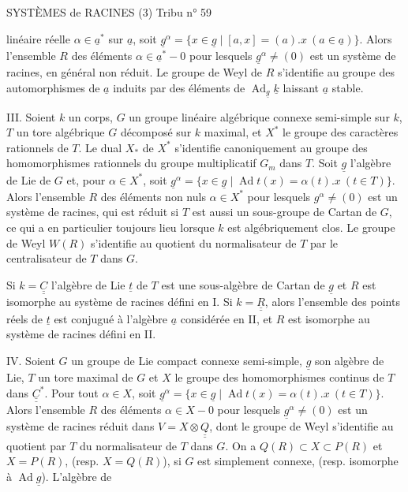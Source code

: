 SYSTÈMES de RACINES (3) \hfill Tribu n° 59

linéaire réelle $\alpha\in\underline{a}^*$ sur $\underline{a}$, soit $\underline{g}^{\alpha}=\{x\in\underline{g}\mid[a,x]=(a).x\ (a\in\underline{a})\}$. Alors l'ensemble $R$ des éléments $\alpha\in\underline{a}^*-0$ pour lesquels $\underline{g}^{\alpha}\neq(0)$ est un système de racines, en général non réduit. Le groupe de Weyl de $R$ s'identifie au groupe des automorphismes de $\underline{a}$ induits par des éléments de $\operatorname{Ad}_{\underline{g}}\underline{k}$ laissant $\underline{a}$ stable.

III. Soient $k$ un corps, $G$ un groupe linéaire algébrique connexe semi-simple sur $k$, $T$ un tore algébrique  $G$ décomposé sur $k$ maximal, et $X^*$ le groupe des caractères rationnels de $T$. Le dual $X_*$ de $X^*$ s'identifie canoniquement au groupe des homomorphismes rationnels du groupe multiplicatif $G_m$ dans $T$. Soit $\underline{g}$ l'algèbre de Lie de $G$ et, pour $\alpha\in X^*$, soit $\underline{g}^{\alpha}=\{x\in\underline{g}\mid\operatorname{Ad}t(x)=\alpha(t).x\ (t\in T)\}$. Alors l'ensemble $R$ des éléments non nuls $\alpha\in X^*$ pour lesquels $g^{\alpha}\neq(0)$ est un système de racines, qui est réduit si $T$ est aussi un sous-groupe de Cartan de $G$, ce qui a en particulier toujours lieu lorsque $k$ est algébriquement clos. Le groupe de Weyl $W(R)$ s'identifie au quotient du normalisateur de $T$ par le centralisateur de $T$ dans $G$.

Si $k=\underline{\underline{C}}$ l'algèbre de Lie $\underline{t}$ de $T$ est une sous-algèbre de Cartan de $\underline{g}$ et $R$ est isomorphe au système de racines défini en I. Si $k=\underline{\underline{R}}$, alors l'ensemble des points réels de $\underline{t}$ est conjugué à l'algèbre $\underline{a}$ considérée en II, et $R$ est isomorphe au système de racines défini en II.

IV. Soient $G$ un groupe de Lie compact connexe semi-simple, $\underline{g}$ son algèbre de Lie, $T$ un tore maximal de $G$ et $X$ le groupe des homomorphismes continus de $T$ dans $\underline{\underline{C}}^*$. Pour tout $\alpha\in X$, soit $\underline{g}^{\alpha}=\{x\in\underline{g}\mid\operatorname{Ad}t(x)=\alpha(t).x\ (t\in T)\}$. Alors l'ensemble $R$ des éléments $\alpha\in X-0$ pour lesquels $\underline{g}^{\alpha}\neq(0)$ est un système de racines réduit dans $V=X\otimes\underline{\underline{Q}}$, dont le groupe de Weyl s'identifie au quotient par $T$ du normalisateur de $T$ dans $G$. On a $Q(R)\subset X\subset P(R)$ et $X=P(R)$, (resp. $X=Q(R)$), si $G$ est simplement connexe, (resp. isomorphe à $\operatorname{Ad}\underline{g}$). L'algèbre de

